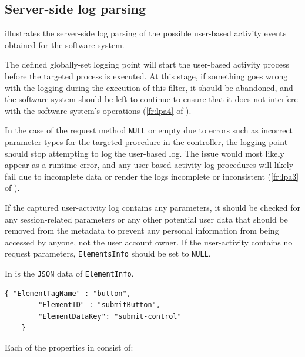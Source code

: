 \clearpage

\subsection{Server-side log parsing}
 illustrates the server-side log parsing of the possible user-based activity events obtained for the software system.\par The defined globally-set logging point will start the user-based activity process before the targeted process  is executed. At this stage, if something goes wrong with the logging during the execution of this filter, it should be abandoned, and the software system should be left to continue to ensure that it does not interfere with the software system's operations (\ref{fr:lpa4} of ). \par In the case of the request method \texttt{NULL} or empty due to errors such as incorrect parameter types for the targeted procedure in the controller, the logging point should stop attempting to log the user-based log. The issue would most likely appear as a runtime error, and any user-based activity log procedures will likely fail due to incomplete data or render the logs incomplete or inconsistent (\ref{fr:lpa3} of ). \par If the captured user-activity log contains any parameters, it should be checked for any session-related parameters or any other potential user data that should be removed from the metadata to prevent any personal information from being accessed by anyone, not the user account owner. If the user-activity contains no request parameters, \texttt{ElementsInfo} should be set to \texttt{NULL}.\par In  is the \texttt{JSON} data of \texttt{ElementInfo}. 

\begin{lstlisting}[style=json, caption={\textit{Element properties JSON}}, label={fig:Ch2_ElementInfo}] 
	{ "ElementTagName" : "button",
		"ElementID" : "submitButton",
		"ElementDataKey": "submit-control"		
	}
\end{lstlisting}

Each of the properties in  consist of:

